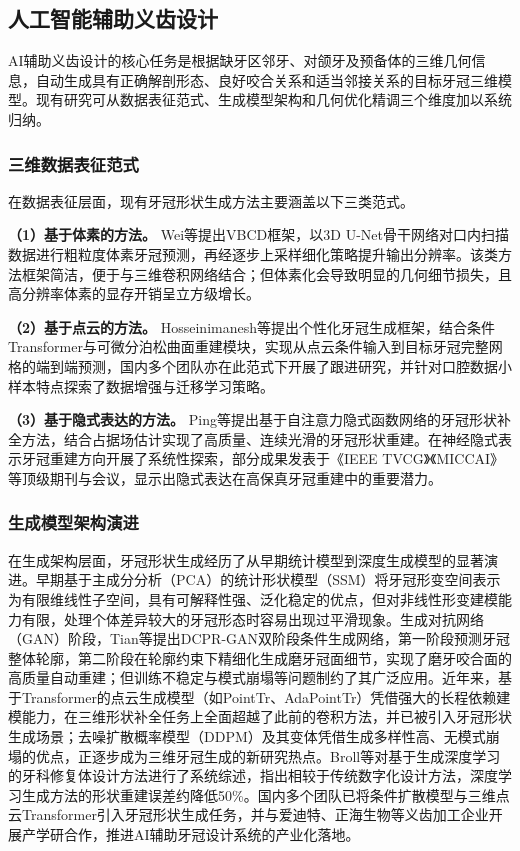 \documentclass[12pt,hyperref,a4paper,UTF8]{ctexart}
\begin{document}
\subsection{人工智能辅助义齿设计}

AI辅助义齿设计的核心任务是根据缺牙区邻牙、对颌牙及预备体的三维几何信息，自动生成具有正确解剖形态、良好咬合关系和适当邻接关系的目标牙冠三维模型。现有研究可从数据表征范式、生成模型架构和几何优化精调三个维度加以系统归纳。

\subsubsection{三维数据表征范式}

在数据表征层面，现有牙冠形状生成方法主要涵盖以下三类范式。

\textbf{（1）基于体素的方法。}
Wei等\cite{wei2025vbcd}提出VBCD框架，以3D U-Net骨干网络对口内扫描数据进行粗粒度体素牙冠预测，再经逐步上采样细化策略提升输出分辨率。该类方法框架简洁，便于与三维卷积网络结合；但体素化会导致明显的几何细节损失，且高分辨率体素的显存开销呈立方级增长。

\textbf{（2）基于点云的方法。}
Hosseinimanesh等\cite{hosseinimanesh2025personalized}提出个性化牙冠生成框架，结合条件Transformer与可微分泊松曲面重建模块，实现从点云条件输入到目标牙冠完整网格的端到端预测，国内多个团队亦在此范式下开展了跟进研究，并针对口腔数据小样本特点探索了数据增强与迁移学习策略。

\textbf{（3）基于隐式表达的方法。}
Ping等\cite{ping2021self}提出基于自注意力隐式函数网络的牙冠形状补全方法，结合占据场估计实现了高质量、连续光滑的牙冠形状重建。在神经隐式表示牙冠重建方向开展了系统性探索，部分成果发表于《IEEE TVCG》《MICCAI》等顶级期刊与会议，显示出隐式表达在高保真牙冠重建中的重要潜力。

\subsubsection{生成模型架构演进}

在生成架构层面，牙冠形状生成经历了从早期统计模型到深度生成模型的显著演进。早期基于主成分分析（PCA）的统计形状模型（SSM）将牙冠形变空间表示为有限维线性子空间，具有可解释性强、泛化稳定的优点，但对非线性形变建模能力有限，处理个体差异较大的牙冠形态时容易出现过平滑现象。生成对抗网络（GAN）阶段，Tian等\cite{tian2021dcpr}提出DCPR-GAN双阶段条件生成网络，第一阶段预测牙冠整体轮廓，第二阶段在轮廓约束下精细化生成磨牙冠面细节，实现了磨牙咬合面的高质量自动重建；但训练不稳定与模式崩塌等问题制约了其广泛应用。近年来，基于Transformer的点云生成模型（如PointTr、AdaPointTr）凭借强大的长程依赖建模能力，在三维形状补全任务上全面超越了此前的卷积方法，并已被引入牙冠形状生成场景\cite{alsheghri2024adaptive}；去噪扩散概率模型（DDPM）及其变体凭借生成多样性高、无模式崩塌的优点，正逐步成为三维牙冠生成的新研究热点。Broll等\cite{broll2024generative}对基于生成深度学习的牙科修复体设计方法进行了系统综述，指出相较于传统数字化设计方法，深度学习生成方法的形状重建误差约降低50\%。国内多个团队已将条件扩散模型与三维点云Transformer引入牙冠形状生成任务，并与爱迪特、正海生物等义齿加工企业开展产学研合作，推进AI辅助牙冠设计系统的产业化落地。
\end{document}
